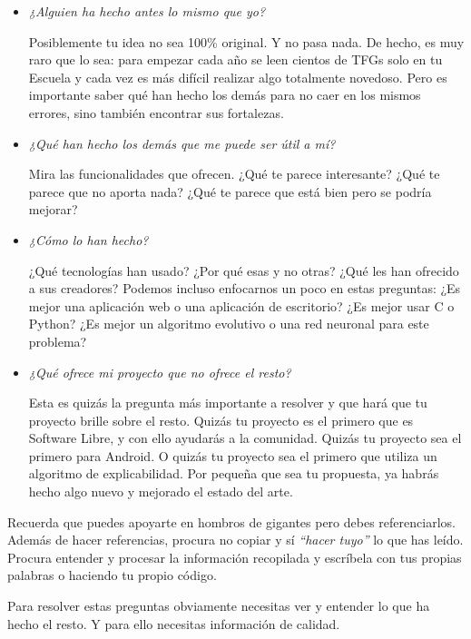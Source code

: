 \begin{itemize}
    \item \textit{¿Alguien ha hecho antes lo mismo que yo?}
    
Posiblemente tu idea no sea 100\% original. Y no pasa nada. De hecho, es muy raro que lo sea: para empezar cada año se leen cientos de TFGs solo en tu Escuela y cada vez es más difícil realizar algo totalmente novedoso. Pero es importante saber qué han hecho los demás para no caer en los mismos errores, sino también encontrar sus fortalezas.

\item \textit{¿Qué han hecho los demás que me puede ser útil a mí?}

Mira las funcionalidades que ofrecen. ¿Qué te parece interesante? ¿Qué te parece que no aporta nada? ¿Qué te parece que está bien pero se podría mejorar?

\item \textit{¿Cómo lo han hecho?} 

¿Qué tecnologías han usado? ¿Por qué esas y no otras? ¿Qué les han ofrecido a sus creadores? Podemos incluso enfocarnos un poco en estas preguntas: ¿Es mejor una aplicación web o una aplicación de escritorio? ¿Es mejor usar C o Python? ¿Es mejor un algoritmo evolutivo o una red neuronal para este problema?

\item \textit{¿Qué ofrece mi proyecto que no ofrece el resto?} 

Esta es quizás la pregunta más importante a resolver y que hará que tu proyecto brille sobre el resto. Quizás tu proyecto es el primero que es Software Libre, y con ello ayudarás a la comunidad. Quizás tu proyecto sea el primero para Android. O quizás tu proyecto sea el primero que utiliza un algoritmo de explicabilidad. Por pequeña que sea tu propuesta, ya habrás hecho algo nuevo y mejorado el estado del arte.

\end{itemize}

Recuerda que puedes apoyarte en hombros de gigantes pero debes referenciarlos. Además de hacer referencias, procura no copiar y sí {\it ``hacer tuyo''} lo que has leído. Procura entender y procesar la información recopilada y escríbela con tus propias palabras o haciendo tu propio código.

Para resolver estas preguntas obviamente necesitas ver y entender lo que ha hecho el resto. Y para ello necesitas información de calidad.

